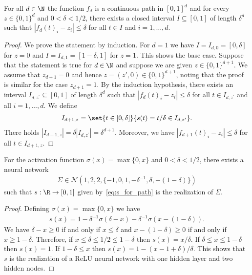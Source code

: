 \documentclass{amsart}[11pt]
\numberwithin{equation}{section}
\newcommand{\nn}{\mathcal{N}}
\numberwithin{theorem}{section}
\begin{document}
\begin{lemma}\label{lem:quad_curve}
    For all $d \in \N$ the function $f_d$ is a continuous path in $[0, 1]^d$ and for every $z\in \{0,1\}^d$ and $0 < \delta < 1/2$, there exists a closed interval $I \subseteq [0, 1]$ of length $\delta^d$ such that $|f_d(t)_i- z_i| \leq \delta$ for all $t \in I$ and $i=1,\ldots,d$.
\end{lemma}
\begin{proof}
    We prove the statement by induction. For $d = 1$ we have $I=I_{d, 0} = [0, \delta]$ for $z=0$ and $I=I_{d, 1} = [1-\delta, 1]$ for $z=1$. This shows the base case.
    Suppose that the statement is true for $d \in \N$ and suppose we are given $z \in \{0, 1\}^{d + 1}$. We assume that $z_{d + 1} = 0$ and hence $z=(z', 0)\in \{0,1\}^{d+1}$, noting that the proof is similar for the case $z_{d + 1} = 1$.  By the induction hypothesis, there exists an interval $I_{d, z^\prime} \subseteq [0, 1]$ of length $\delta^d$ such that $|f_d(t)_i- z_i| \leq \delta$ for all $t \in I_{d, z^\prime}$ and all $i=1,\ldots,d$. We define 
    \begin{align*}
        I_{d + 1, z} = \set{t\in[0,\delta]}{s(t)=t/\delta \in I_{d, z^\prime} }.
    \end{align*}
    There holds $|I_{d + 1, z}|= \delta|I_{d,z^\prime}|=\delta^{d+1}$. Moreover,  we have $|f_{d + 1}(t)_i - z_i| \leq \delta$ for all $t \in I_{d + 1, z}$.
\end{proof}

\begin{lemma}\label{lem:curve_with_relu}
    For the activation function $\sigma(x) = \max\{0, x\}$ and $0 < \delta < 1/2$, there exists a neural network
    \begin{align*}
        \Sigma \in \nn(1, 2, 2, \{-1, 0, 1, -\delta^{-1}, \delta, -(1 - \delta)\})
    \end{align*}
    such that $s: \R \to [0, 1]$ given by~\eqref{eq:s_for_path} is the realization of $\Sigma$.
\end{lemma}
\begin{proof}
    Defining $\sigma(x) = \max\{0, x\}$ we have 
    \begin{align*}
        s(x) = 1 - \delta^{-1} \sigma\left(\delta - x\right) - \delta^{-1} \sigma\left(x - (1 - \delta)\right).
    \end{align*}
    We have $\delta - x \geq 0$ if and only if $x \leq \delta$ and $x - (1 - \delta) \geq 0$ if and only if $x \geq 1 - \delta$. Therefore, if $x \leq \delta \leq 1/2 \leq 1 - \delta$ then $s(x) = x/\delta$. If $\delta \leq x \leq 1 - \delta$ then $s(x) = 1$. If $1 - \delta \leq x$ then $s(x) = 1 - (x - 1 + \delta)/\delta$. This shows that $s$ is the realization of a ReLU neural network with one hidden layer and two hidden nodes.
\end{proof}
\end{document}
